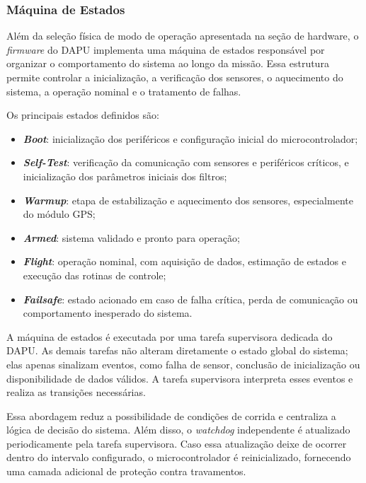 \subsubsection{Máquina de Estados}
\label{subsec:maquinaEstados}

Além da seleção física de modo de operação apresentada na seção de hardware, o \textit{firmware} do DAPU implementa uma máquina de estados responsável por organizar o comportamento do sistema ao longo da missão. Essa estrutura permite controlar a inicialização, a verificação dos sensores, o aquecimento do sistema, a operação nominal e o tratamento de falhas.

Os principais estados definidos são:

\begin{itemize}
    \item \textit{\textbf{Boot}}: inicialização dos periféricos e configuração inicial do microcontrolador;
    \item \textit{\textbf{Self-Test}}: verificação da comunicação com sensores e periféricos críticos, e inicialização dos parâmetros iniciais dos filtros;
    \item \textit{\textbf{Warmup}}: etapa de estabilização e aquecimento dos sensores, especialmente do módulo GPS;
    \item \textit{\textbf{Armed}}: sistema validado e pronto para operação;
    \item \textit{\textbf{Flight}}: operação nominal, com aquisição de dados, estimação de estados e execução das rotinas de controle;
    \item \textit{\textbf{Failsafe}}: estado acionado em caso de falha crítica, perda de comunicação ou comportamento inesperado do sistema.
\end{itemize}

A máquina de estados é executada por uma tarefa supervisora dedicada do DAPU. As demais tarefas não alteram diretamente o estado global do sistema; elas apenas sinalizam eventos, como falha de sensor, conclusão de inicialização ou disponibilidade de dados válidos. A tarefa supervisora interpreta esses eventos e realiza as transições necessárias.

Essa abordagem reduz a possibilidade de condições de corrida e centraliza a lógica de decisão do sistema. Além disso, o \textit{watchdog} independente é atualizado periodicamente pela tarefa supervisora. Caso essa atualização deixe de ocorrer dentro do intervalo configurado, o microcontrolador é reinicializado, fornecendo uma camada adicional de proteção contra travamentos.

